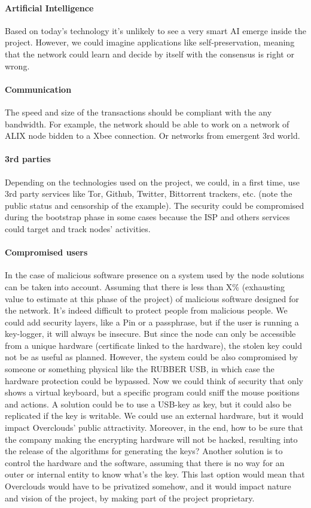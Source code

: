 \paragraph{Artificial Intelligence} Based on today's technology it's unlikely to see a very  smart AI emerge inside the project. However, we could imagine applications like self-preservation, meaning that the network could learn and decide by itself with the consensus is right or wrong.

\paragraph{Communication} The speed and size of the transactions should be compliant with the any bandwidth. For example, the network should be able to work on a network of ALIX node bidden to a Xbee connection. Or networks from emergent 3rd world.

\paragraph{3rd parties} Depending on the technologies used on the project, we could, in a first time, use 3rd party services like Tor, Github, Twitter, Bittorrent trackers, etc. (note the public status and censorship of the example). The security could be compromised during the bootstrap phase in some cases because the ISP and others services could target and track nodes' activities.

\paragraph{Compromised users} In the case of malicious software presence on a system used by the node solutions can be taken into account. Assuming that there is less than X\% (exhausting value to estimate at this phase of the project) of malicious software designed for the network. It's indeed difficult to protect people from malicious people. We could add security layers, like a Pin or a passphrase, but if the user is running a key-logger, it will always be insecure. But since the node can only be accessible from a unique hardware (certificate linked to the hardware), the stolen key could not be as useful as planned. However, the system could be also compromised by someone or something physical like the RUBBER USB\cite{HakshopRubberUSB}, in which case the hardware protection could be bypassed. Now we could think of security that only shows a virtual keyboard, but a specific program could sniff the mouse positions and actions. A solution could be to use a USB-key as key, but it could also be replicated if the key is writable. We could use an external hardware, but it would impact Overclouds' public attractivity. Moreover, in the end, how to be sure that the company making the encrypting hardware will not be hacked, resulting into the release of the algorithms for generating the keys? Another solution is to control the hardware and the software, assuming that there is no way for an outer or internal entity to know what's the key. This last option would mean that Overclouds would have to be privatized somehow, and it would impact nature and vision of the project, by making part of the project proprietary.

